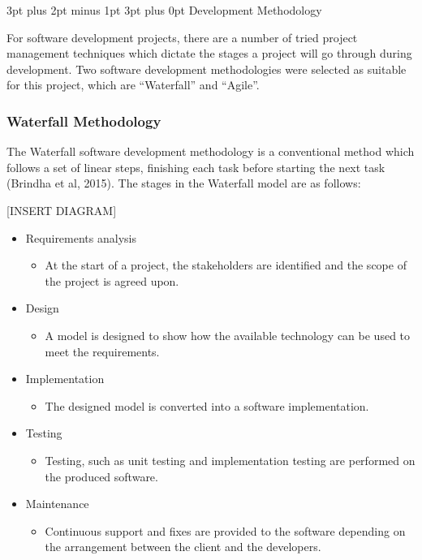 \documentclass[12pt,a4paper]{article}
\makeatletter
\renewcommand\subsection{\@startsection {subsection}{1}{2mm} %
                               {3pt plus 2pt minus 1pt} %
                               {3pt plus 0pt} %
                               {\normalfont\bfseries}}
\makeatother
\begin{document}
\FloatBarrier

\subsection{Development Methodology}

For software development projects, there are a number of tried project management techniques which dictate the stages a project will go through during development. Two software development methodologies were selected as suitable for this project, which are ``Waterfall'' and ``Agile''.

\subsubsection{Waterfall Methodology}

The Waterfall software development methodology is a conventional method which follows a set of linear steps, finishing each task before starting the next task (Brindha et al, 2015). The stages in the Waterfall model are as follows:

[INSERT DIAGRAM]

\begin{itemize}
    \item Requirements analysis
    \begin{itemize}
        \item At the start of a project, the stakeholders are identified and the scope of the project is agreed upon.
    \end{itemize}
    \item Design
    \begin{itemize}
        \item A model is designed to show how the available technology can be used to meet the requirements.
    \end{itemize}
    \item Implementation
    \begin{itemize}
        \item The designed model is converted into a software implementation.
    \end{itemize}
    \item Testing
    \begin{itemize}
        \item Testing, such as unit testing and implementation testing are performed on the produced software.
    \end{itemize}
    \item Maintenance
    \begin{itemize}
        \item Continuous support and fixes are provided to the software depending on the arrangement between the client and the developers.
    \end{itemize}
\end{itemize}
\end{document}
